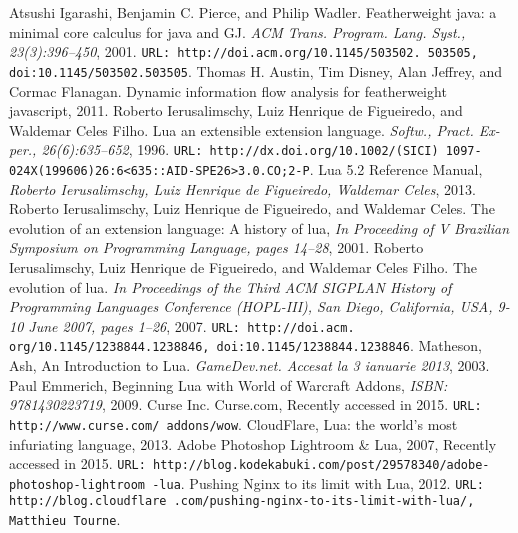 \begin{thebibliography}{10}
\addtolength{\leftmargin}{0.2in} %
\setlength{\itemindent}{-0.2in}

 Atsushi Igarashi, Benjamin C. Pierce, and Philip Wadler. Featherweight java: a minimal core calculus for java and GJ. {\it ACM Trans. Program. Lang. Syst., 23(3):396–450}, 2001. {\tt URL: http://doi.acm.org/10.1145/503502. 503505, doi:10.1145/503502.503505}.
 Thomas H. Austin, Tim Disney, Alan Jeffrey, and Cormac Flanagan. Dynamic information flow analysis for featherweight javascript, 2011.
 Roberto Ierusalimschy, Luiz Henrique de Figueiredo, and Waldemar Celes Filho. Lua an extensible extension language. {\it Softw., Pract. Ex- per., 26(6):635–652}, 1996. {\tt URL: http://dx.doi.org/10.1002/(SICI) 1097-024X(199606)26:6<635::AID-SPE26>3.0.CO;2-P}.
 Lua 5.2 Reference Manual, {\it Roberto Ierusalimschy, Luiz Henrique de Figueiredo, Waldemar Celes}, 2013.
 Roberto Ierusalimschy, Luiz Henrique de Figueiredo, and Waldemar Celes. The evolution of an extension language: A history of lua, {\it In Proceeding of V Brazilian Symposium on Programming Language, pages 14–28}, 2001.
 Roberto Ierusalimschy, Luiz Henrique de Figueiredo, and Waldemar Celes Filho. The evolution of lua. {\it In Proceedings of the Third ACM SIGPLAN History of Programming Languages Conference (HOPL-III), San Diego, California, USA, 9-10 June 2007, pages 1–26}, 2007. {\tt URL: http://doi.acm. org/10.1145/1238844.1238846, doi:10.1145/1238844.1238846}.
 Matheson, Ash, An Introduction to Lua. {\it GameDev.net. Accesat la 3 ianuarie 2013}, 2003.
 Paul Emmerich, Beginning Lua with World of Warcraft Addons, {\it ISBN: 9781430223719}, 2009.
 Curse Inc. Curse.com, Recently accessed in 2015. {\tt URL: http://www.curse.com/
addons/wow}.
 CloudFlare, Lua: the world's most infuriating language, 2013.
 Adobe Photoshop Lightroom \& Lua, 2007, Recently accessed in 2015. {\tt URL: http://blog.kodekabuki.com/post/29578340/adobe-photoshop-lightroom
-lua}.
 Pushing Nginx to its limit with Lua, 2012. {\tt URL: http://blog.cloudflare
.com/pushing-nginx-to-its-limit-with-lua/, Matthieu Tourne}.


\end{thebibliography}
